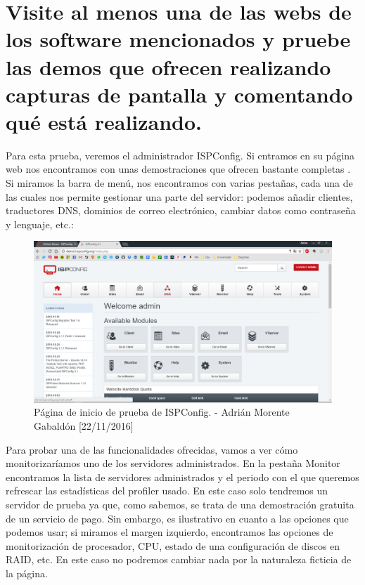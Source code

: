 \section{Visite al menos una de las webs de los software mencionados y pruebe las demos que ofrecen realizando capturas de pantalla y comentando qué está realizando.}
Para esta prueba, veremos el administrador ISPConfig. Si entramos en su página web nos encontramos con unas demostraciones que ofrecen bastante completas \cite{ispconfig}. Si miramos la barra de menú, nos encontramos con varias pestañas, cada una de las cuales nos permite gestionar una parte del servidor: podemos añadir clientes, traductores DNS, dominios de correo electrónico, cambiar datos como contraseña y lenguaje, etc.:
\begin{figure}[H]
	\centering
	\includegraphics[scale=0.4]{ispconfig-admin}
	\caption{Página de inicio de prueba de ISPConfig. - Adrián Morente Gabaldón [22/11/2016]}
	\label{fig:figura11}
\end{figure}
Para probar una de las funcionalidades ofrecidas, vamos a ver cómo monitorizaríamos uno de los servidores administrados. En la pestaña Monitor encontramos la lista de servidores administrados y el periodo con el que queremos refrescar las estadísticas del profiler usado. En este caso solo tendremos un servidor de prueba ya que, como sabemos, se trata de una demostración gratuita de un servicio de pago. Sin embargo, es ilustrativo en cuanto a las opciones que podemos usar; si miramos el margen izquierdo, encontramos las opciones de monitorización de procesador, CPU, estado de una configuración de discos en RAID, etc. En este caso no podremos cambiar nada por la naturaleza ficticia de la página.

